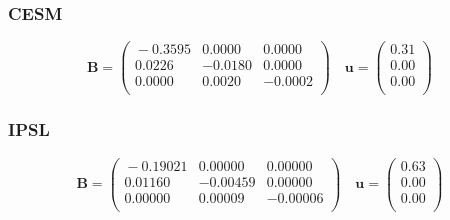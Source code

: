 \documentclass[draft,linenumbers]{agujournal}
\begin{document}
\subsubsection*{CESM}
\begin{equation}
\mathbf{B} =
\begin{pmatrix}{}
  -0.3595 & 0.0000 & 0.0000 \\ 
  0.0226 & -0.0180 & 0.0000 \\ 
  0.0000 & 0.0020 & -0.0002 \\ 
  \end{pmatrix}
\quad {\bm u} =
\begin{pmatrix}{}
  0.31 \\ 
  0.00 \\ 
  0.00 \\ 
  \end{pmatrix}
\end{equation}

\subsubsection*{IPSL}
\begin{equation}
\mathbf{B} =
\begin{pmatrix}{}
  -0.19021 & 0.00000 & 0.00000 \\ 
  0.01160 & -0.00459 & 0.00000 \\ 
  0.00000 & 0.00009 & -0.00006 \\ 
  \end{pmatrix}
\quad {\bm u} =
\begin{pmatrix}{}
  0.63 \\ 
  0.00 \\ 
  0.00 \\ 
  \end{pmatrix}
\end{equation}
\end{document}

